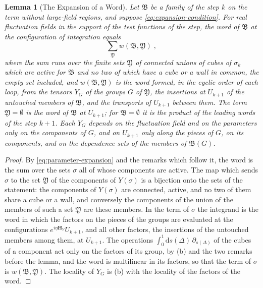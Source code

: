 \documentclass[11pt]{preprint}
\newcommand{\dd}{\mathrm{d}}
\numberwithin{equation}{section}
\newtheorem{lemma}[theorem]{Lemma}
\theoremstyle{definition}
\theoremstyle{remark}
\theoremstyle{plain}
\begin{document}
\begin{lemma}[The Expansion of a Word]\label{lem:word-expansion}
Let $\mathfrak B$ be a family of the step $k$ on the term without large-field regions, and suppose \eqref{eq:expansion-condition}. For real fluctuation fields in the support of the test functions of the step, the word of $\mathfrak B$ at the configuration of integration equals
\begin{equation}\label{eq:word-expansion}
    \sum_{\mathfrak Y}w(\mathfrak B, \mathfrak Y)\;,
\end{equation}
where the sum runs over the finite sets $\mathfrak Y$ of connected unions of cubes of $\sigma_k$ which are active for $\mathfrak B$ and no two of which have a cube or a wall in common, the empty set included, and $w(\mathfrak B, \mathfrak Y)$ is the word formed, in the cyclic order of each loop, from the tensors $Y_G$ of the groups $G$ of $\mathfrak Y$, the insertions at $U_{k+1}$ of the untouched members of $\mathfrak B$, and the transports of $U_{k+1}$ between them. The term $\mathfrak Y = \emptyset$ is the word of $\mathfrak B$ at $U_{k+1}$; for $\mathfrak B = \emptyset$ it is the product of the leading words of the step $k + 1$. Each $Y_G$ depends on the fluctuation field and on the parameters only on the components of $G$, and on $U_{k+1}$ only along the pieces of $G$, on its components, and on the dependence sets of the members of $\mathfrak B(G)$.
\end{lemma}

\begin{proof}
By \eqref{eq:parameter-expansion} and the remarks which follow it, the word is the sum over the sets $\sigma$ all of whose components are active. The map which sends $\sigma$ to the set $\mathfrak Y$ of the components of $Y(\sigma)$ is a bijection onto the sets of the statement: the components of $Y(\sigma)$ are connected, active, and no two of them share a cube or a wall, and conversely the components of the union of the members of such a set $\mathfrak Y$ are these members. In the term of $\sigma$ the integrand is the word in which the factors on the pieces of the groups are evaluated at the configurations $e^{i\eta\mathbf H_Y}U_{k+1}$, and all other factors, the insertions of the untouched members among them, at $U_{k+1}$. The operations $\int_0^1\dd s(\Delta)\,\partial_{s(\Delta)}$ of the cubes of a component act only on the factors of its group, by (b) and the two remarks before the lemma, and the word is multilinear in its factors, so that the term of $\sigma$ is $w(\mathfrak B, \mathfrak Y)$. The locality of $Y_G$ is (b) with the locality of the factors of the word.
\end{proof}
\end{document}

